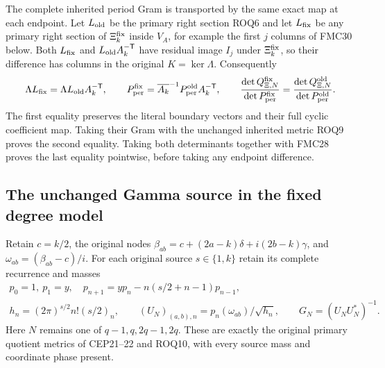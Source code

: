 \documentclass[11pt,a4paper]{article}
\begin{document}
The complete inherited period Gram is transported by the same exact
map at each endpoint. Let $L_{\rm old}$ be the primary right
section ROQ6 and let $L_{\rm fix}$ be any primary right section
of $\Xi_k^{\rm fix}$ inside $V_A$, for example the first $j$
columns of FMC30 below. Both $L_{\rm fix}$ and
$L_{\rm old}A_k^{-\mathsf T}$ have residual image $I_j$ under
$\Xi_k^{\rm fix}$, so their difference has columns in the
original $K=\ker\Lambda$. Consequently
\[
 \Lambda L_{\rm fix}=\Lambda L_{\rm old}A_k^{-\mathsf T},\qquad
 P_{\rm per}^{\rm fix}
     =\overline{A_k}^{-1}P_{\rm per}^{\rm old}A_k^{-\mathsf T},
 \qquad
 \frac{\det Q_{\Xi,N}^{\rm fix}}{\det P_{\rm per}^{\rm fix}}
     =\frac{\det Q_{\Xi,N}^{\rm old}}{\det P_{\rm per}^{\rm old}}.
\]
The first equality preserves the literal boundary vectors and their
full cyclic coefficient map. Taking their Gram with the unchanged
inherited metric ROQ9 proves the second equality. Taking both
determinants together with FMC28 proves the last equality pointwise,
before taking any endpoint difference.

\subsection{The unchanged Gamma source in the fixed degree model}

Retain $c=k/2$, the original nodes
$\beta_{ab}=c+(2a-k)\delta+i(2b-k)\gamma$, and
$\omega_{ab}=(\beta_{ab}-c)/i$. For each original source
$s\in\{1,k\}$ retain its complete recurrence and masses
\[
 \begin{gathered}
 p_0=1,\ p_1=y,\quad
 p_{n+1}=yp_n-n(s/2+n-1)p_{n-1},\\
 h_n=(2\pi)^{s/2}n!(s/2)_n,\qquad
 (U_N)_{(a,b),n}=p_n(\omega_{ab})/\sqrt{h_n},\qquad
 G_N=(U_NU_N^*)^{-1}.
 \end{gathered}\tag{FMC29}
\]
Here $N$ remains one of $q-1,q,2q-1,2q$. These are exactly the
original primary quotient metrics of CEP21--22 and ROQ10, with
every source mass and coordinate phase present.
\end{document}
